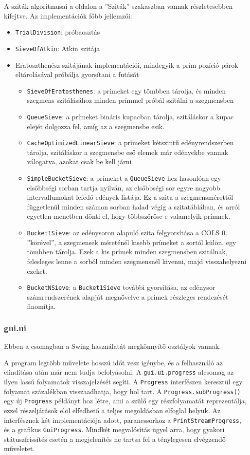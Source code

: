 A sziták algoritmusai a \pageref{sec:szitak} oldalon a ''Sziták'' szakaszban vannak részletesebben kifejtve.
Az implementációk főbb jellemzői:
\begin{itemize}
\item \texttt{TrialDivision}: próbaosztás
\item \texttt{SieveOfAtkin}: Atkin szitája
\item Eratoszthenész szitájának implementációi, mindegyik a prím-pozíció párok eltárolásával próbálja gyorsítani a futását
\begin{itemize}
\item \texttt{SieveOfEratosthenes}: a prímeket egy tömbben tárolja, és minden szegmens szitálásához minden prímmel próbál szitálni a szegmensben
\item \texttt{QueueSieve}: a prímeket bináris kupacban tárolja, szitáláskor a kupac elejét dolgozza fel, amíg az a szegmensbe esik.
\item \texttt{CacheOptimizedLinearSieve}: a prímeket kétszintű edényrendszerben tárolja, szitáláskor a szegmensbe eső elemek már edényekbe vannak válogatva, azokat csak be kell járni
\item \texttt{SimpleBucketSieve}: a prímeket a \texttt{QueueSieve}-hez hasonlóan egy elsőbbségi sorban tartja nyilván, az elsőbbségi sor egyre nagyobb intervallumokat lefedő edények listája. Ez a szita a szegmensmérettől függetlenül minden számon sorban halad végig a szitatáblában, és arról egyetlen menetben dönti el, hogy többszöröse-e valamelyik prímnek.
\item \texttt{Bucket1Sieve}: az edénysoron alapuló szita felgyorsítása a COLS 0. ''körével'', a szegmensek méreténél kisebb prímeket a sortól külön, egy tömbben tárolja. Ezek a kis prímek minden szegmensben szitálnak, felesleges lenne a sorból minden szegmensnél kivenni, majd visszahelyezni ezeket.
\item \texttt{BucketNSieve}: a \texttt{Bucket1Sieve} további gyorsítása, az edénysor számrendszerének alapját megnövelve a prímek részleges rendezését finomítja.
\end{itemize}
\end{itemize}

\subsubsection{gui.ui}

Ebben a csomagban a Swing használatát megkönnyítő osztályok vannak.

A program legtöbb művelete hosszú időt vesz igénybe, és a felhasználó az elindítása után már nem tudja befolyásolni.
A \texttt{gui.ui.progress} alcsomag az ilyen lassú folyamatok visszajelzését segíti.
A \texttt{Progress} interfészen keresztül egy folyamat százalékban visszaadhatja, hogy hol tart.
A \texttt{Progress.subProgress()} egy új \texttt{Progress} példányt hoz létre, ami a szülő egy részfolyamatát reprezentálja, ezzel részeljárások elöl elfedhető a teljes megoldásban elfoglal helyük.
Az interfésznek két implementációja adott, parancssorhoz a \texttt{PrintStreamProgress}, és a grafikus \texttt{GuiProgress}.
Mindkét megvalósítás ügyel arra, hogy gyakori státuszfrissítés esetén a megjelenítés ne tartsa fel a ténylegesen elvégzendő műveletet.

